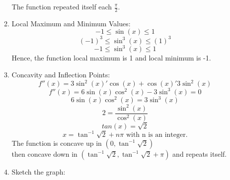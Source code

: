 \documentclass[12pt]{article}
\begin{document}
\begin{enumerate}
\begin{enumerate}
\begin{center}
\begin{tabular}{c c c c c c c c c c c c c}
                    \end{tabular}    
                \end{center}     
            The function repeated itself each $\frac{\pi}{2}$. 
            \item Local Maximum and Minimum Values:
                \[ -1 \leq \sin(x) \leq 1\]
                \[ (-1)^3 \leq \sin^3(x) \leq (1)^3\]
                \[ -1 \leq \sin^3(x) \leq 1\]
            Hence, the function local maximum is 1 and local minimum is -1.
            \item Concavity and Inflection Points:
                \[f''(x) = 3\sin^2(x)'\cos(x) + \cos(x)'3\sin^2(x)\]
                \[f''(x) = 6\sin(x)\cos^2(x) - 3\sin^3(x) = 0\]
                \[6\sin(x)\cos^2(x) = 3\sin^3(x)\]
                \[2 = \frac{\sin^2(x)}{\cos^2(x)}\]
                \[tan(x) = \sqrt{2}\]
                \[x = \tan^{-1}\sqrt{2} + n\pi \text{ with n is an integer.}\]
            The function is concave up in $(0, \tan^{-1}\sqrt{2})$ \\
            then concave down in $(\tan^{-1}\sqrt{2}, \tan^{-1}\sqrt{2} + \pi)$ and repeats itself.
            \newpage
            \item Sketch the graph:
            \begin{figure}[!h]
                \centering
                \begin{framed}
                \end{framed}

\end{figure}
\end{enumerate}
\end{enumerate}
\end{document}
